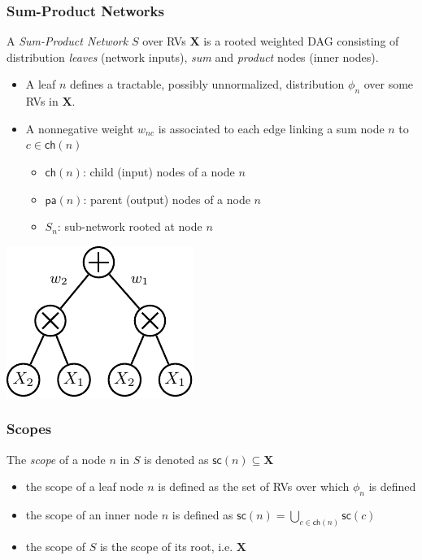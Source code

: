 \documentclass[10pt, t, xcolor={usenames,dvipsnames,svgnames}, compress]{beamer}
\begin{document}
\begin{frame}
  \frametitle{Sum-Product Networks}
  A \emph{Sum-Product Network} $S$ over RVs $\mathbf X$ is a
  rooted weighted DAG consisting of
  distribution \emph{leaves} (network inputs),  \emph{sum} and \emph{product}
  nodes (inner nodes).

\vspace{0.5 cm}
\begin{minipage}{0.65\textwidth}
\begin{itemize}
\item  A leaf $n$ defines a tractable, possibly unnormalized, distribution
  $\phi_{n}$ over some RVs in $\mathbf X$.
\item  A nonnegative weight $w_{nc}$ is associated to each edge linking a sum node
  $n$ to $c\in\mathsf{ch}(n)$
\begin{itemize}
\item $\mathsf{ch}(n)$:  child (input) nodes of   a node $n$ 
\item $\mathsf{pa}(n)$:  parent (output) nodes of a node $n$
\item $S_{n}$: sub-network rooted at node $n$ 
\end{itemize}
\end{itemize}
\end{minipage}
\begin{minipage}{0.3\textwidth}
\centering
\includegraphics[width=0.9\columnwidth]{figures/spn-mixture.pdf}
\end{minipage}
\end{frame}

\begin{frame}
  \frametitle{Scopes}
  The \emph{scope} of a node $n$ in $S$ is denoted as
  $\mathsf{sc}(n)\subseteq\mathbf{X}$
\begin{itemize}
\item   the scope of a leaf node $n$ is defined as the set of RVs over which
  $\phi_{n}$ is defined
\item the scope of an inner node $n$ is defined as
  $\mathsf{sc}(n)=\bigcup_{c\in\mathsf{ch}(n)}\mathsf{sc}(c)$
\item the scope of $S$ is the scope of its root, i.e. $\mathbf{X}$
\end{itemize}
\end{frame}
\end{document}
